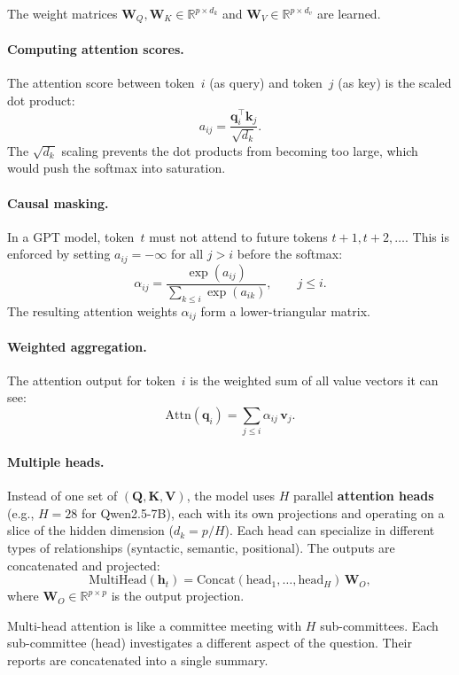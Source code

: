 \documentclass[11pt, twoside, openright]{memoir}
\begin{document}
The weight matrices $\mathbf{W}_Q, \mathbf{W}_K \in \mathbb{R}^{p \times d_k}$
and $\mathbf{W}_V \in \mathbb{R}^{p \times d_v}$ are learned.

\paragraph{Computing attention scores.}  The attention score between
token~$i$ (as query) and token~$j$ (as key) is the scaled dot product:
\[
  a_{ij} = \frac{\mathbf{q}_i^\top \mathbf{k}_j}{\sqrt{d_k}}.
\]
The $\sqrt{d_k}$ scaling prevents the dot products from becoming too large,
which would push the softmax into saturation.

\paragraph{Causal masking.}  In a GPT model, token~$t$ must not attend to
future tokens $t+1, t+2, \ldots$.  This is enforced by setting
$a_{ij} = -\infty$ for all $j > i$ before the softmax:
\[
  \alpha_{ij} = \frac{\exp(a_{ij})}{\sum_{k \leq i} \exp(a_{ik})},
  \qquad j \leq i.
\]
The resulting attention weights $\alpha_{ij}$ form a lower-triangular matrix.

\paragraph{Weighted aggregation.}  The attention output for token~$i$ is
the weighted sum of all value vectors it can see:
\[
  \text{Attn}(\mathbf{q}_i) = \sum_{j \leq i} \alpha_{ij} \, \mathbf{v}_j.
\]

\paragraph{Multiple heads.}  Instead of one set of $(\mathbf{Q}, \mathbf{K},
\mathbf{V})$, the model uses $H$ parallel \textbf{attention heads}
(e.g., $H = 28$ for Qwen2.5-7B), each with its own projections and operating
on a slice of the hidden dimension ($d_k = p / H$).  Each head can
specialize in different types of relationships (syntactic, semantic,
positional).  The outputs are concatenated and projected:
\[
  \text{MultiHead}(\mathbf{h}_t) =
  \text{Concat}(\text{head}_1, \ldots, \text{head}_H) \, \mathbf{W}_O,
\]
where $\mathbf{W}_O \in \mathbb{R}^{p \times p}$ is the output projection.

\begin{analogy}
Multi-head attention is like a committee meeting with $H$ sub-committees.
Each sub-committee (head) investigates a different aspect of the question.
Their reports are concatenated into a single summary.
\end{analogy}
\end{document}
